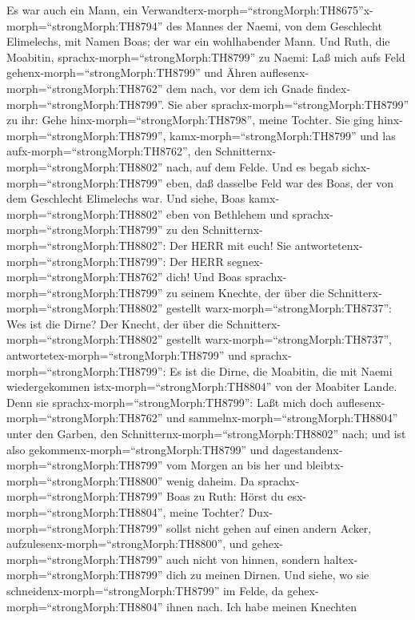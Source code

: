  Es war auch ein Mann, ein
Verwandterx-morph=``strongMorph:TH8675''x-morph=``strongMorph:TH8794''
des Mannes der Naemi, von dem Geschlecht Elimelechs, mit Namen Boas; der
war ein wohlhabender Mann.  Und Ruth, die Moabitin,
sprachx-morph=``strongMorph:TH8799'' zu Naemi: Laß mich aufs Feld
gehenx-morph=``strongMorph:TH8799'' und Ähren
auflesenx-morph=``strongMorph:TH8762'' dem nach, vor dem ich Gnade
findex-morph=``strongMorph:TH8799''. Sie aber
sprachx-morph=``strongMorph:TH8799'' zu ihr: Gehe
hinx-morph=``strongMorph:TH8798'', meine Tochter.  Sie ging
hinx-morph=``strongMorph:TH8799'', kamx-morph=``strongMorph:TH8799'' und
las aufx-morph=``strongMorph:TH8762'', den
Schnitternx-morph=``strongMorph:TH8802'' nach, auf dem Felde. Und es
begab sichx-morph=``strongMorph:TH8799'' eben, daß dasselbe Feld war des
Boas, der von dem Geschlecht Elimelechs war.  Und siehe,
Boas kamx-morph=``strongMorph:TH8802'' eben von Bethlehem und
sprachx-morph=``strongMorph:TH8799'' zu den
Schnitternx-morph=``strongMorph:TH8802'': Der HERR mit euch! Sie
antwortetenx-morph=``strongMorph:TH8799'': Der HERR
segnex-morph=``strongMorph:TH8762'' dich!  Und Boas
sprachx-morph=``strongMorph:TH8799'' zu seinem Knechte, der über die
Schnitterx-morph=``strongMorph:TH8802'' gestellt
warx-morph=``strongMorph:TH8737'': Wes ist die Dirne?  Der
Knecht, der über die Schnitterx-morph=``strongMorph:TH8802'' gestellt
warx-morph=``strongMorph:TH8737'',
antwortetex-morph=``strongMorph:TH8799'' und
sprachx-morph=``strongMorph:TH8799'': Es ist die Dirne, die Moabitin,
die mit Naemi wiedergekommen istx-morph=``strongMorph:TH8804'' von der
Moabiter Lande.  Denn sie
sprachx-morph=``strongMorph:TH8799'': Laßt mich doch
auflesenx-morph=``strongMorph:TH8762'' und
sammelnx-morph=``strongMorph:TH8804'' unter den Garben, den
Schnitternx-morph=``strongMorph:TH8802'' nach; und ist also
gekommenx-morph=``strongMorph:TH8799'' und
dagestandenx-morph=``strongMorph:TH8799'' vom Morgen an bis her und
bleibtx-morph=``strongMorph:TH8800'' wenig daheim.  Da
sprachx-morph=``strongMorph:TH8799'' Boas zu Ruth: Hörst du
esx-morph=``strongMorph:TH8804'', meine Tochter?
Dux-morph=``strongMorph:TH8799'' sollst nicht gehen auf einen andern
Acker, aufzulesenx-morph=``strongMorph:TH8800'', und
gehex-morph=``strongMorph:TH8799'' auch nicht von hinnen, sondern
haltex-morph=``strongMorph:TH8799'' dich zu meinen Dirnen. 
Und siehe, wo sie schneidenx-morph=``strongMorph:TH8799'' im Felde, da
gehex-morph=``strongMorph:TH8804'' ihnen nach. Ich habe meinen Knechten
